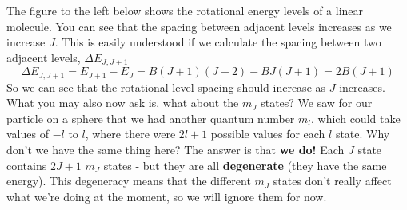 \documentclass{memoir}[11pt,oneside,a4paper,openany]
\begin{document}
The figure to the left below shows the rotational energy levels of a linear molecule. You can see that the spacing between adjacent levels increases as we increase $J$. This is easily understood if we calculate the spacing between two adjacent levels, $\Delta E_{J,J+1}$
\begin{equation}
	\Delta E_{J,J+1} = E_{J+1}-E_J = B(J+1)(J+2)-BJ(J+1) = 2B(J+1)
\end{equation}
So we can see that the rotational level spacing should increase as $J$ increases. What you may also now ask is, what about the $m_J$ states? We saw for our particle on a sphere that we had another quantum number $m_l$, which could take values of $-l$ to $l$, where there were $2l+1$ possible values for each $l$ state. Why don't we have the same thing here? The answer is that \textbf{we do!} Each $J$ state contains $2J+1$ $m_J$ states - but they are all \textbf{degenerate} (they have the same energy). This degeneracy means that the different $m_J$ states don't really affect what we're doing at the moment, so we will ignore them for now.
\end{document}
